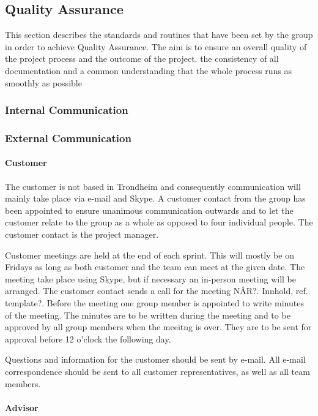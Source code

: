 \subsection{Quality Assurance}

This section describes the standards and routines that have been set by the group in order to achieve Quality Assurance. The aim is to ensure an overall quality of the project process and the outcome of the project. the consistency of all documentation and a common understanding that the whole process runs as smoothly as possible

\subsubsection{Internal Communication}



\subsubsection{External Communication}

\paragraph{Customer}

The customer is not based in Trondheim and consequently communication will mainly take place via e-mail and Skype. A customer contact from the group has been appointed to ensure unanimous communication outwards and to let the customer relate to the group as a whole as opposed to four individual people. The customer contact is the project manager. 

Customer meetings are held at the end of each sprint. This will mostly be on Fridays as long as both customer and the team can meet at the given date. The meeting take place using Skype, but if necessary an in-person meeting will be arranged. The customer contact sends a call for the meeting NÅR?. Innhold, ref. template?. Before the meeting one group member is appointed to write minutes of the meeting. The minutes are to be written during the meeting and to be approved by all group members when the meeitng is over. They are to be sent for approval before 12 o'clock the following day. 

Questions and information for the customer should be sent by e-mail. All e-mail correspondence should be sent to all customer representatives, as well as all team members.


\paragraph{Advisor}

